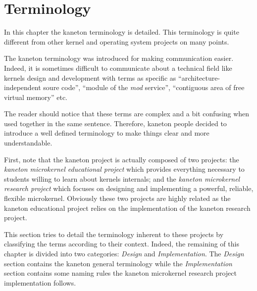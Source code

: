 %
%
%
%
%
%

%
%

\chapter{Terminology}
\label{chapter:terminology}

In this chapter the kaneton terminology is detailed. This terminology is
quite different from other kernel and operating system projects on many points.

\newpage

%
%

The kaneton terminology was introduced for making communication easier.
Indeed, it is sometimes difficult to communicate about a technical
field like kernels design and development with terms as specific as
``architecture-independent soure code'', ``module of the \textit{mod}
service'', ``contiguous area of free virtual memory'' etc.

The reader should notice that these terms are complex and a bit confusing
when used together in the same sentence. Therefore, kaneton people decided to
introduce a well defined terminology to make things clear and more
understandable.

First, note that the kaneton project is actually composed of two projects:
the \textit{kaneton microkernel educational project} which provides everything
necessary to students willing to learn about kernels internals; and the
\textit{kaneton microkernel research project} which focuses on designing and
implementing a powerful, reliable, flexible microkernel. Obviously these
two projects are highly related as the kaneton educational project relies on
the implementation of the kaneton research project.

This section tries to detail the terminology inherent to these projects by
classifying the terms according to their context. Indeed, the remaining of
this chapter is divided into two categories: \textit{Design} and
\textit{Implementation}. The \textit{Design} section contains the kaneton
general terminology while the \textit{Implementation} section contains some
naming rules the kaneton microkernel research project implementation follows.

